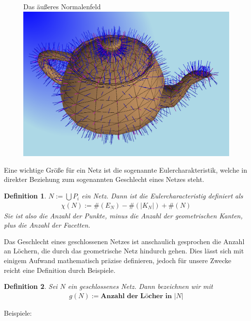 \documentclass[]{article}
\newtheorem{Definition}{Definition}
\begin{document}
\begin{figure}[H]
\centering
Das äußeres Normalenfeld\\
\includegraphics[scale=0.2]{teapot-normals.png}
\end{figure}
Eine wichtige Größe für ein Netz ist die sogenannte Eulercharakteristik, welche in direkter Beziehung zum sogenannten Geschlecht eines Netzes steht.

\begin{Definition}
$N:= \bigcup P_i$ ein Netz. Dann ist die Eulercharacteristig definiert als
\begin{align*}
\chi(N):= \#(E_N) - \#(|K_N|) + \#(N) 
\end{align*}
Sie ist also die Anzahl der  Punkte, minus die Anzahl der geometrischen Kanten, plus die Anzahl der Facetten.
\end{Definition}

Das Geschlecht eines geschlossenen Netzes ist anschaulich gesprochen die Anzahl an Löchern, die durch das geometrische Netz hindurch gehen. Dies lässt sich mit einigem Aufwand mathematisch präzise definieren, jedoch für unsere Zwecke reicht eine Definition durch Beispiele.
\begin{Definition}
Sei $N$ ein geschlossenes Netz. Dann bezeichnen wir mit
\begin{align*}
g(N):= \textbf{Anzahl der Löcher in } |N|
\end{align*}
\end{Definition}
Beispiele:
\end{document}
